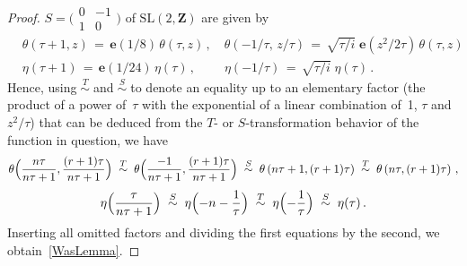 \documentclass[12pt,reqno]{amsart}
\theoremstyle{definition}
\def\Z{\mathbf Z}   %
\def\SL{\mathrm{SL}}
\def\nn{n}
\def\e{\mathbf{e}}
\def\SL{\mathrm{SL}}
\def\Tsim{\;\stackrel T\sim\;}
\def\Ssim{\;\stackrel S\sim\;}
\begin{document}
\begin{proof}
$S=\bigl(\begin{smallmatrix}0&-1\\1&0\end{smallmatrix})$ of $\SL(2,\Z)$ are 
given by 
\begin{align*}
&\theta(\tau+1,z)\,=\, \e(1/8) \, \theta(\tau,z)\,, \quad
\theta(-1/\tau,\,z/\tau) \,=\, \sqrt{\tau/i} \; 
\e(z^2/2\tau)\,\theta(\tau,z)\, \\
& \eta(\tau+1)\,=\,\e(1/24) \,\eta(\tau)\,, \qquad\; \eta(-1/\tau) 
\,=\, \sqrt{\tau/i} \;\eta(\tau)\,. 
\end{align*}
Hence, using$\Tsim$and$\Ssim$to denote an equality up to an elementary 
factor (the product of a power of~$\tau$ with the exponential of a linear 
combination of~1, $\tau$ and $z^2/\tau$) that can be deduced from the $T$- 
or $S$-transformation behavior of the function in question, we have
$$
\theta\Bigl(\frac{\nn\tau}{\nn\tau+1}, \frac{(r+1)\tau}{\nn\tau+1}\Bigr) 
\Tsim \theta\Bigl(\frac{-1}{\nn\tau+1}, \frac{(r+1)\tau}{\nn\tau+1}\Bigr) 
\Ssim \theta\left(\nn\tau+1, (r+1)\tau \right)  
\Tsim \theta\left(\nn\tau, (r+1)\tau \right) \,,
$$
$$
\eta\Bigl(\frac{\tau}{\nn\tau+1}\Bigr) 
\Ssim \eta\Bigl(-\nn-\frac{1}{\tau}\Bigr) 
\Tsim \eta\Bigl(-\frac{1}{\tau}\Bigr) \Ssim \eta(\tau) \,.
$$
Inserting all omitted factors and dividing the first equations by the second, 
we obtain~\eqref{WasLemma}.


\end{proof}
\end{document}

